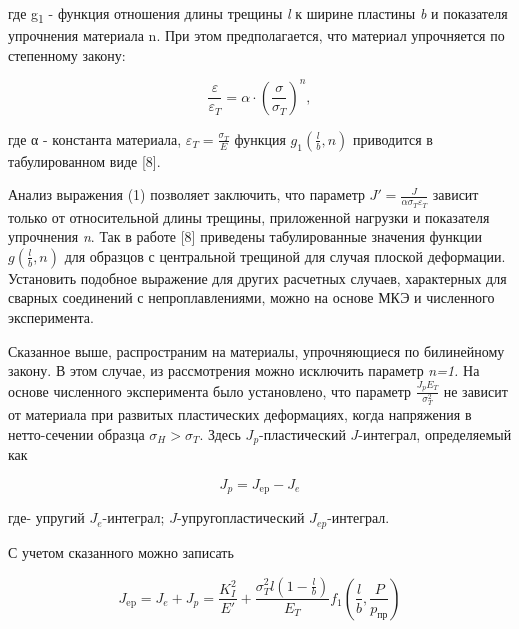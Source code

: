 \begin{multicols}{2}
где g\textsubscript{1} - функция отношения длины трещины \emph{l} к
ширине пластины \emph{b} и показателя упрочнения материала n. При этом
предполагается, что материал упрочняется по степенному закону:

\begin{equation}
\frac{\varepsilon}{\varepsilon_{T}} = \alpha \cdot \left( \frac{\sigma}{\sigma_{T}} \right)^{n},
\end{equation}

где α - константа материала, $\varepsilon_{T} = \frac{\sigma_{T}}{E}$ функция
$g_{1} \left( \frac{l}{b}, n \right)$ приводится в табулированном виде
{[}8{]}.

Анализ выражения (1) позволяет заключить, что параметр
$J' = \frac{J}{\alpha \sigma_{T} \varepsilon_{T}}$ зависит только от относительной
длины трещины, приложенной нагрузки и показателя упрочнения \emph{n}.
Так в работе {[}8{]} приведены табулированные значения функции
$g \left( \frac{l}{b}, n \right)$ для образцов с центральной трещиной
для случая плоской деформации. Установить подобное выражение для других
расчетных случаев, характерных для сварных соединений с
непроплавлениями, можно на основе МКЭ и численного эксперимента.

Сказанное выше, распространим на материалы, упрочняющиеся по билинейному
закону. В этом случае, из рассмотрения можно исключить параметр
\emph{n=1.} На основе численного эксперимента было установлено, что
параметр $\frac{J_{p} E_{T}}{\sigma_{T}^{2}}$ не зависит от материала при
развитых пластических деформациях, когда напряжения в нетто-сечении
образца $\sigma_{H} > \sigma_{T}$. Здесь
$J_{p}$-пластический
$J$-интеграл, определяемый как

\begin{equation}
J_{p} = J_{\text{ep}} - J_{e}
\end{equation}

где- упругий
$J_{e}$-интеграл;
$J$-упругопластический
$J_{ep}$-интеграл.

С учетом сказанного можно записать
\end{multicols}

\begin{equation}
J_{\text{ep}} = J_{e} + J_{p} = \frac{K_{I}^{2}}{E'} + \frac{\sigma_{T}^{2} l \left(1 - \frac{l}{b}\right)}{E_{T}} f_{1} \left( \frac{l}{b}, \frac{P}{p_{\text{пр}}} \right)
\end{equation}

